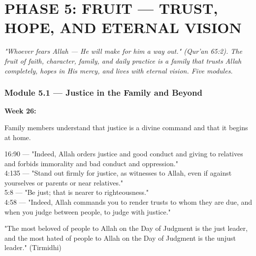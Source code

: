\documentclass[11pt,a4paper]{article}
\begin{document}
\vspace{6pt}\noindent{\color{border}\rule{\textwidth}{0.5pt}}\vspace{6pt}

\newpage
\section{PHASE 5: FRUIT --- TRUST, HOPE, AND ETERNAL VISION}

\begin{quotebox}\itshape "Whoever fears Allah --- He will make for him a way out." (Qur'an 65:2). The fruit of faith, character, family, and daily practice is a family that trusts Allah completely, hopes in His mercy, and lives with eternal vision. Five modules.\end{quotebox}

\subsubsection*{Module 5.1 --- Justice in the Family and Beyond}
\textbf{Week 26:} 

\begin{outcomebox} Family members understand that justice is a divine command and that it begins at home. \end{outcomebox}

\begin{quranbox} 16:90 --- "Indeed, Allah orders justice and good conduct and giving to relatives and forbids immorality and bad conduct and oppression." \\ 4:135 --- "Stand out firmly for justice, as witnesses to Allah, even if against yourselves or parents or near relatives." \\ 5:8 --- "Be just; that is nearer to righteousness." \\ 4:58 --- "Indeed, Allah commands you to render trusts to whom they are due, and when you judge between people, to judge with justice." \end{quranbox}

\begin{hadithbox} "The most beloved of people to Allah on the Day of Judgment is the just leader, and the most hated of people to Allah on the Day of Judgment is the unjust leader." (Tirmidhi) \end{hadithbox}
\end{document}
